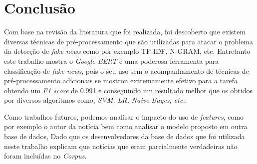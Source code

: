 \section{Conclusão}


Com base na revisão da literatura que foi realizada, foi descoberto que existem diversas técnicas de pré-processamento que são utilizadas para atacar o problema da detecção de \textit{fake news} como por exemplo TF-IDF, N-GRAM, etc. Entretanto este trabalho mostra o \textit{Google BERT} é uma poderosa ferramenta para classificação de \textit{fake news}, pois o seu uso sem o acompanhamento de técnicas de pré-processamento adicionais se mostrou extremamente efetivo para a tarefa obtendo um \textit{F1 score} de 0.991 e conseguindo um resultado melhor que os obtidos por diversos algoritmos como, \textit{SVM, LR, Naive Bayes, etc.}.


Como trabalhos futuros, podemos analisar o impacto do uso de \textit{features}, como por exemplo o autor da notícia bem como analisar o modelo proposto em outra base de dados, Dado que os desenvolvedores da base de dados que foi utilizada neste trabalho explicam que notícias que eram parcialmente verdadeiras não foram incluídas no \textit{Corpus}. 


